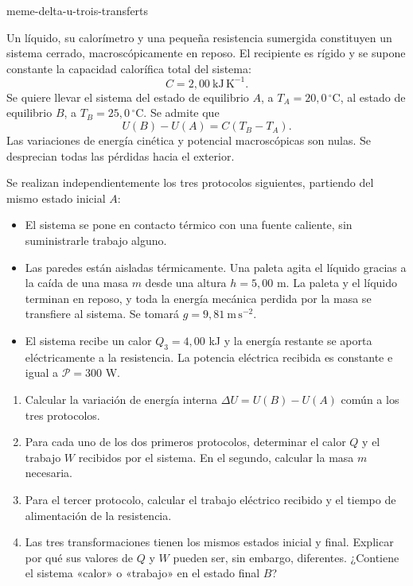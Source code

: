 \begin{exo}{meme-delta-u-trois-transferts}

Un líquido, su calorímetro y una pequeña resistencia sumergida constituyen un
sistema cerrado, macroscópicamente en reposo. El recipiente es rígido y se
supone constante la capacidad calorífica total del sistema:
\[C=2{,}00\ \mathrm{kJ\,K^{-1}}.\]
Se quiere llevar el sistema del estado de equilibrio $A$, a
$T_A=20{,}0\,^\circ\mathrm{C}$, al estado de equilibrio $B$, a
$T_B=25{,}0\,^\circ\mathrm{C}$. Se admite que
\[U(B)-U(A)=C(T_B-T_A).\]
Las variaciones de energía cinética y potencial macroscópicas son nulas. Se
desprecian todas las pérdidas hacia el exterior.

Se realizan independientemente los tres protocolos siguientes, partiendo del
mismo estado inicial $A$:
\begin{itemize}
\item[Protocolo 1] El sistema se pone en contacto térmico con una fuente caliente, sin suministrarle trabajo alguno.
\item[Protocolo 2] Las paredes están aisladas térmicamente. Una paleta agita el líquido gracias a la caída de una masa $m$ desde una altura $h=5{,}00$ m. La paleta y el líquido terminan en reposo, y toda la energía mecánica perdida por la masa se transfiere al sistema. Se tomará $g=9{,}81\ \mathrm{m\,s^{-2}}$.
\item[Protocolo 3] El sistema recibe un calor $Q_3=4{,}00$ kJ y la energía restante se aporta eléctricamente a la resistencia. La potencia eléctrica recibida es constante e igual a $\mathcal P=300$ W.
\end{itemize}

\begin{enumerate}
\item Calcular la variación de energía interna $\Delta U=U(B)-U(A)$ común a los tres protocolos.
\item Para cada uno de los dos primeros protocolos, determinar el calor $Q$ y el trabajo $W$ recibidos por el sistema. En el segundo, calcular la masa $m$ necesaria.
\item Para el tercer protocolo, calcular el trabajo eléctrico recibido y el tiempo de alimentación de la resistencia.
\item Las tres transformaciones tienen los mismos estados inicial y final. Explicar por qué sus valores de $Q$ y $W$ pueden ser, sin embargo, diferentes. ¿Contiene el sistema «calor» o «trabajo» en el estado final $B$?
\end{enumerate}


\end{exo}
